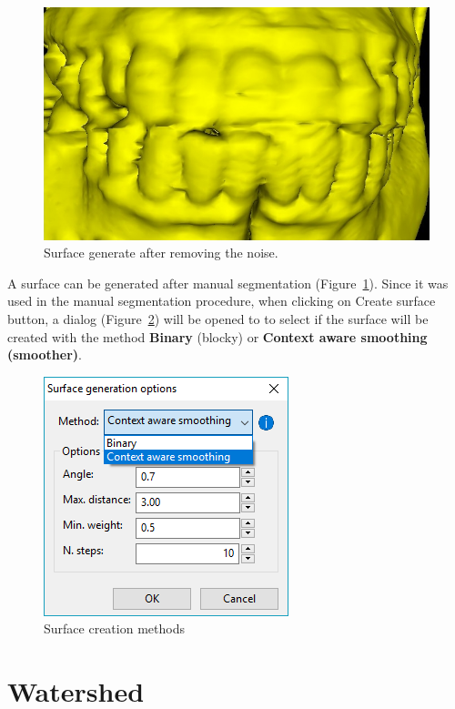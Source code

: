 \begin{figure}[!htb]
\centering
\includegraphics[scale=0.3]{../user_guide_figures/invesalius_screen/segmentation_manual_noise_amalgam_removed_3d_zoom.jpg}
\caption{Surface generate after removing the noise.}
\label{fig:surface_edited_amalgaman}
\end{figure}

A surface can be generated after manual segmentation (Figure~\ref{fig:surface_edited_amalgaman}). Since it was used in the manual segmentation procedure, when clicking on Create surface button, a dialog (Figure~\ref{fig:new_surface_edited}) will be opened to to select if the surface will be created with the method \textbf{Binary} (blocky) or \textbf{Context aware smoothing (smoother)}.

\begin{figure}[!htb]
\centering
\includegraphics[scale=0.5]{../user_guide_figures/invesalius_screen/surface_generation_dialog_en.png}
\caption{Surface creation methods}
\label{fig:new_surface_edited}
\end{figure}


\section{Watershed}

